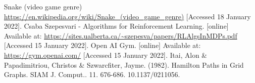 \documentclass[lettersize,journal]{IEEEtran}
\begin{document}
\begin{thebibliography}{1}
    Snake (video game genre) \url{https://en.wikipedia.org/wiki/Snake_(video_game_genre)} [Accessed 18 January 2022].
    Csaba Szepesvari - Algorithms for Reinforcement Learning. [online] Available at: \url{https://sites.ualberta.ca/~szepesva/papers/RLAlgsInMDPs.pdf} [Accessed 15 January 2022].
    Open AI Gym. [online] Available at: \url{https://gym.openai.com/} [Accessed 15 January 2022].
Itai, Alon \& Papadimitriou, Christos \& Szwarcfiter, Jayme. (1982). Hamilton Paths in Grid Graphs. SIAM J. Comput.. 11. 676-686. 10.1137/0211056.
\end{thebibliography}
\end{document}
